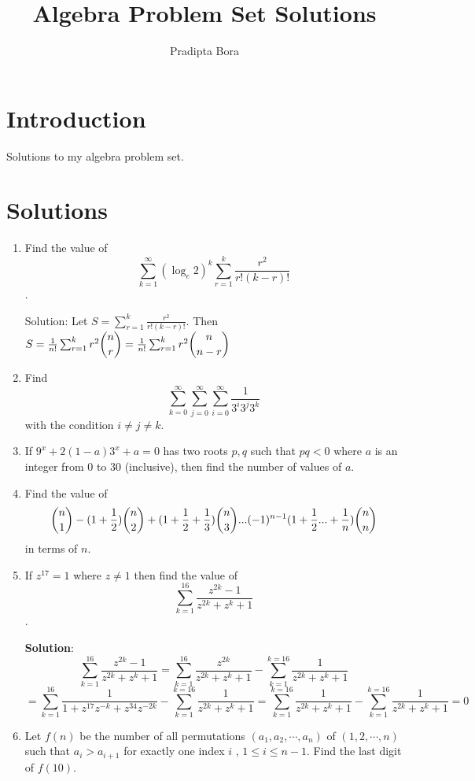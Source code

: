 \documentclass[a4paper]{article}
\title{Algebra Problem Set Solutions}
\author{Pradipta Bora}
\begin{document}
\maketitle


\section{Introduction}

Solutions to my algebra problem set.

\section{Solutions}

\begin{enumerate}
\item Find the value of $$ \sum_{k=1}^{\infty} (\log_e 2)^k \sum_{r=1}^k \frac {r^2}{r!(k-r)!} $$.

Solution: Let $S = \sum_{r=1}^k \frac {r^2}{r!(k-r)!}$.
Then $S = \frac{1}{n!} \sum_{r=1}^k r^2 \dbinom{n}{r} = \frac{1}{n!} \sum_{r=1}^k r^2 \dbinom{n}{n-r}$

\item Find $$ \sum_{k=0}^{\infty} \sum_{j=0}^{\infty} \sum_{i=0}^{\infty} \frac{1}{3^i3^j3^k}$$ with the condition $ i\neq j \neq k$.

\item If $ 9^x + 2(1-a) 3^x + a = 0 $ has two roots $p, q$ such that $pq < 0$ where $a$ is an
integer from $0$ to $30$ (inclusive), then find the number of values of $a$.

\item Find the value of $$  \dbinom{n}{1} - (1 + \frac{1}{2})\dbinom{n}{2} + (1 + \frac{1}{2} + \frac{1}{3})\dbinom{n}{3}... (-1)^{n-1}(1 + \frac{1}{2} ... + \frac{1}{n})\dbinom{n}{n}$$ in terms of $n$. 

\item If $z^{17} = 1$ where $ z \neq 1$ then find the value of $$ \displaystyle \sum_{k=1}^{16} \frac{z^{2k} - 1}{z^{2k} + z^{k} + 1} $$.

\textbf{Solution}: $$  \sum_{k=1}^{16} \frac{z^{2k} - 1}{z^{2k} + z^{k} + 1}  = \sum_{k=1}^{16} \frac{z^{2k}}{z^{2k} + z^{k} + 1} - \sum_{k=1}^{k=16} \frac{1}{z^{2k} + z^{k} + 1}$$
$$ = \sum_{k=1}^{16} \frac{1}{1 + z^{17}z^{-k} + z^{34}z^{-2k}} - \sum_{k=1}^{k=16} \frac{1}{z^{2k} + z^{k} + 1} = \sum_{k=1}^{k=16} \frac{1}{z^{2k} + z^{k} + 1} - \sum_{k=1}^{k=16} \frac{1}{z^{2k} + z^{k} + 1} = 0$$

\item Let $f(n)$ be the number of all permutations $(a_1,a_2, \cdots , a_n)$ of $(1,2, \cdots ,n)$ such that $a_i > a_{i+1} $ for exactly one index $i$ , $ 1 \le i \le n-1$. Find the last digit of $f(10)$.


\end{enumerate}
\end{document}
